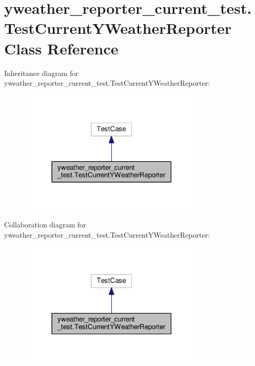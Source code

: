 \hypertarget{classyweather__reporter__current__test_1_1TestCurrentYWeatherReporter}{\section{yweather\-\_\-reporter\-\_\-current\-\_\-test.\-Test\-Current\-Y\-Weather\-Reporter Class Reference}
\label{classyweather__reporter__current__test_1_1TestCurrentYWeatherReporter}
}


Inheritance diagram for yweather\-\_\-reporter\-\_\-current\-\_\-test.\-Test\-Current\-Y\-Weather\-Reporter\-:
\nopagebreak
\begin{figure}[H]
\begin{center}
\leavevmode
\includegraphics[width=254pt]{classyweather__reporter__current__test_1_1TestCurrentYWeatherReporter__inherit__graph}
\end{center}
\end{figure}


Collaboration diagram for yweather\-\_\-reporter\-\_\-current\-\_\-test.\-Test\-Current\-Y\-Weather\-Reporter\-:
\nopagebreak
\begin{figure}[H]
\begin{center}
\leavevmode
\includegraphics[width=254pt]{classyweather__reporter__current__test_1_1TestCurrentYWeatherReporter__coll__graph}
\end{center}
\end{figure}
